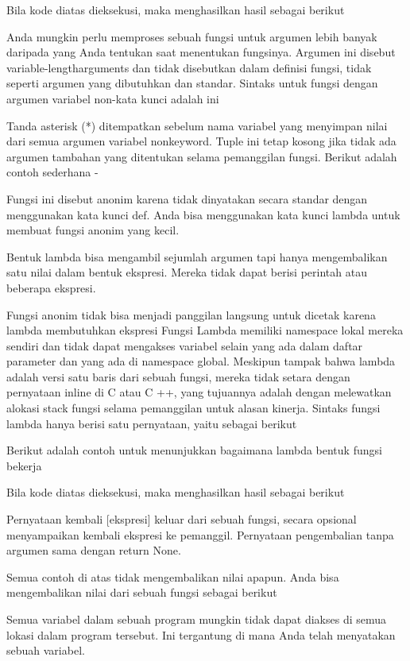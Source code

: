 Bila kode diatas dieksekusi, maka menghasilkan hasil sebagai berikut 

Anda mungkin perlu memproses sebuah fungsi untuk argumen lebih banyak daripada yang Anda tentukan saat menentukan fungsinya. Argumen ini disebut variable-lengtharguments dan tidak disebutkan dalam definisi fungsi, tidak seperti argumen yang dibutuhkan dan standar. 
Sintaks untuk fungsi dengan argumen variabel non-kata kunci adalah ini 

Tanda asterisk (*) ditempatkan sebelum nama variabel yang menyimpan nilai dari semua argumen variabel nonkeyword. Tuple ini tetap kosong jika tidak ada argumen tambahan yang ditentukan selama pemanggilan fungsi. Berikut adalah contoh sederhana - \par

Fungsi ini disebut anonim karena tidak dinyatakan secara standar dengan menggunakan kata kunci def. Anda bisa menggunakan kata kunci lambda untuk membuat fungsi anonim yang kecil. \par

Bentuk lambda bisa mengambil sejumlah argumen tapi hanya mengembalikan satu nilai dalam bentuk ekspresi. Mereka tidak dapat berisi perintah atau beberapa ekspresi. \par
Fungsi anonim tidak bisa menjadi panggilan langsung untuk dicetak karena lambda  membutuhkan ekspresi Fungsi Lambda memiliki namespace lokal mereka sendiri dan tidak dapat mengakses variabel selain yang ada dalam daftar parameter dan yang ada di namespace global. 
Meskipun tampak bahwa lambda adalah versi satu baris dari sebuah fungsi, mereka tidak setara dengan pernyataan inline di C atau C ++, yang tujuannya adalah dengan  melewatkan alokasi stack fungsi selama pemanggilan untuk alasan kinerja. 
Sintaks fungsi lambda hanya berisi satu pernyataan, yaitu sebagai berikut 

Berikut adalah contoh untuk menunjukkan bagaimana lambda bentuk fungsi bekerja 

Bila kode diatas dieksekusi, maka menghasilkan hasil sebagai berikut 

Pernyataan kembali [ekspresi] keluar dari sebuah fungsi, secara opsional menyampaikan kembali ekspresi ke pemanggil. Pernyataan pengembalian tanpa argumen sama dengan return None. \par

Semua contoh di atas tidak mengembalikan nilai apapun. Anda bisa mengembalikan nilai dari sebuah fungsi sebagai berikut

Semua variabel dalam sebuah program mungkin tidak dapat diakses di semua lokasi dalam program tersebut. Ini tergantung di mana Anda telah menyatakan sebuah variabel. 
 
